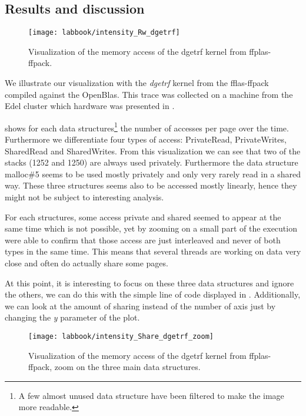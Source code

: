 \subsection{Results and discussion}

\begin{figure}[htb]
    \centering
    \texttt{[image: labbook/intensity\_Rw\_dgetrf]}
    \caption{Visualization of the memory access of the dgetrf kernel from ffplas-ffpack.}
    \label{fig:dgetrf-intensity}
\end{figure}

We illustrate our visualization with the \emph{dgetrf} kernel from the fflas-ffpack~\cite{group16FFLASFFPACK} compiled against the OpenBlas.
This trace was collected on a machine from the Edel cluster which hardware was presented in .

 shows for each data structures\footnote{
    A few almost unused data structure have been filtered to make the image more readable.}
    the number of accesses per page over the time. Furthermore we differentiate four types of access: PrivateRead, PrivateWrites, SharedRead and SharedWrites.
From this visualization we can see that two of the stacks (1252 and 1250) are always used privately.
Furthermore the data structure malloc\#5 seems to be used mostly privately and only very rarely read in a shared way.
These three structures seems also to be accessed mostly linearly, hence they might not be subject to interesting analysis.

For each structures, some access private and shared seemed to appear at the same time which is not possible, yet by zooming on a small part of the execution were able to confirm that those access are just interleaved and never of both types in the same time.
This means that several threads are working on data very close and often do actually share some pages.



At this point, it is interesting to focus on these three data structures and ignore the others, we can do this with the simple line of code displayed in .
Additionally, we can look at the amount of sharing instead of the number of axis just by changing the \emph{y} parameter of the plot.

\begin{figure}[htb]
    \centering
    \texttt{[image: labbook/intensity\_Share\_dgetrf\_zoom]}
    \caption{Visualization of the memory access of the dgetrf kernel from ffplas-ffpack, zoom on the three main data structures.}
    \label{fig:dgetrf-share-zoom}
\end{figure}

